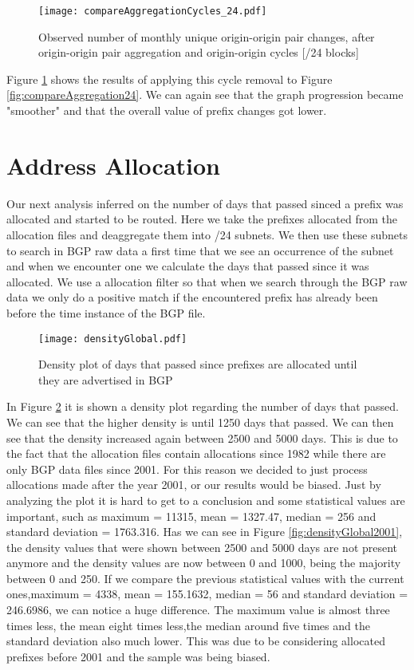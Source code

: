\documentclass[11pt,a4paper]{scrreprt}
\begin{document}
\begin{figure}[!h]
\centering
\texttt{[image: compareAggregationCycles\_24.pdf]}
\caption{Observed number of monthly
unique origin-origin pair changes, after origin-origin pair aggregation and origin-origin cycles [/24 blocks]}
\label{fig:compareAggregationCycles24}
\end{figure}

Figure \ref{fig:compareAggregationCycles24} shows the results of applying this cycle removal to Figure \ref{fig:compareAggregation24}. We can again see that the graph progression became "smoother" and that the overall value of prefix changes got lower. 

\section{Address Allocation}

Our next analysis inferred on the number of days that passed sinced a prefix was allocated and started to be routed. Here we take the prefixes allocated from the allocation files and deaggregate them into /24 subnets. We then use these subnets to search in BGP raw data a first time that we see an occurrence of the subnet and when we encounter one we calculate the days that passed since it was allocated. We use a allocation filter so that when we search through the BGP raw data we only do a positive match if the encountered prefix has already been before the time instance of the BGP file.  

\begin{figure}[!h]
\centering
\texttt{[image: densityGlobal.pdf]}
\caption{Density plot of days that passed since prefixes are allocated until they are advertised in BGP}
\label{fig:densityGlobal}
\end{figure}

In Figure \ref{fig:densityGlobal} it is shown a density plot regarding the number of days that passed. We can see that the higher density is until 1250 days that passed. We can then see that the density increased again between 2500 and 5000 days. This is due to the fact that the allocation files contain allocations since 1982 while there are only BGP data files since 2001. For this reason we decided to just process allocations made after the year 2001, or our results would be biased. Just by analyzing the plot it is hard to get to a conclusion and some statistical values are important, such as maximum = 11315, mean = 1327.47, median = 256 and standard deviation = 1763.316. 
Has we can see in Figure \ref{fig:densityGlobal2001}, the density values that were shown between 2500
and 5000 days  are not present anymore and the density values are now between 0 and 1000, being the majority between 0 and 250. If we compare the previous statistical values with the current ones,maximum = 4338, mean = 155.1632, median = 56 and standard deviation = 246.6986, we can notice a huge difference. The maximum value is almost three times less, the mean eight times less,the median around five times and the standard deviation also much lower. This was due to be considering allocated prefixes before 2001 and the sample was being biased.
\end{document}
